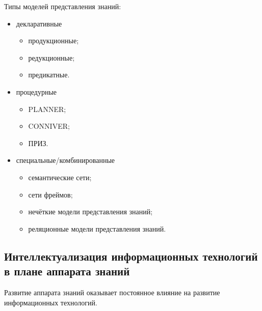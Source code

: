 \documentclass[a4paper,12pt]{report}
\begin{document}
	Типы моделей представления знаний:
	\begin{itemize}
		\item декларативные
			\begin{itemize}
				\item продукционные;
				\item редукционные;
				\item предикатные.
			\end{itemize}
		\item процедурные
			\begin{itemize}
				\item PLANNER;
				\item CONNIVER;
				\item ПРИЗ.
			\end{itemize}
		\item специальные/комбинированные
			\begin{itemize}
				\item семантические сети;
				\item сети фреймов;
				\item нечёткие модели представления знаний;
				\item реляционные модели представления знаний.
			\end{itemize}
	\end{itemize}


\subsection{Интеллектуализация информационных технологий в плане аппарата
	знаний}

	Развитие аппарата знаний оказывает постоянное влияние на развитие
	информационных технологий.
\end{document}
